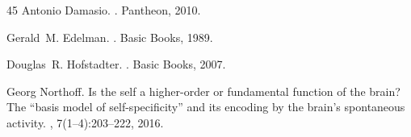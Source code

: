 \documentclass{article}
\begin{document}
\begin{thebibliography}{45}
Antonio Damasio.
.
\newblock Pantheon, 2010.

Gerald~M. Edelman.
.
\newblock Basic Books, 1989.

Douglas~R. Hofstadter.
.
\newblock Basic Books, 2007.

Georg Northoff.
\newblock Is the self a higher-order or fundamental function of the brain?
  The ``basis model of self-specificity'' and its encoding by the
  brain's spontaneous activity.
, 7(1--4):203--222, 2016.

\end{thebibliography}
\end{document}
